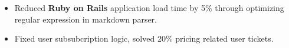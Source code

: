 \documentclass[11pt, letterpaper]{simple-cv}
\begin{document}
\begin{itemize}[topsep=0pt]
\item Reduced \textbf{Ruby on Rails} application load time by 5\% through optimizing regular expression in markdown parser.
\item Fixed user subsubcription logic, solved 20\% pricing related user tickets.
\end{itemize}


\end{document}
